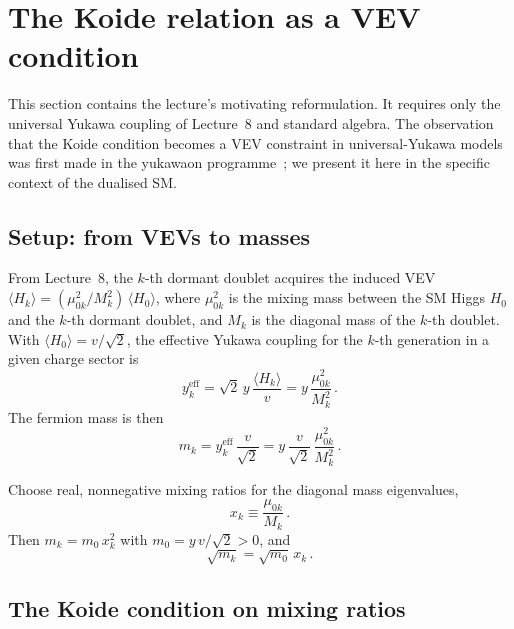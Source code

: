 \documentclass[11pt,a4paper]{article}
\begin{document}
\section{The Koide relation as a VEV condition}
\label{sec:koide-vev}

This section contains the lecture's motivating reformulation.  It requires only
the universal Yukawa coupling of Lecture~8 and standard algebra.
The observation that the Koide condition becomes a VEV constraint
in universal-Yukawa models was first made in the yukawaon
programme~\cite{Koide1983,HabaKoide2008,Ma2007}; we present it
here in the specific context of the dualised SM.

\subsection{Setup: from VEVs to masses}

From Lecture~8, the $k$-th dormant doublet acquires the induced VEV
$\langle H_k\rangle = (\mu_{0k}^2/M_k^2)\,\langle H_0\rangle$, where
$\mu_{0k}^2$ is the mixing mass between the SM Higgs $H_0$ and the
$k$-th dormant doublet, and $M_k$ is the diagonal mass of the $k$-th
doublet.  With $\langle H_0\rangle = v/\sqrt{2}$, the effective
Yukawa coupling for the $k$-th generation in a given charge sector
is
\begin{equation}
  y_k^{\text{eff}} = \sqrt{2}\,y\,\frac{\langle H_k\rangle}{v}
  = y\,\frac{\mu_{0k}^2}{M_k^2}\,.
  \label{eq:yk}
\end{equation}
The fermion mass is then
\begin{equation}
  m_k = y_k^{\text{eff}}\,\frac{v}{\sqrt{2}}
  = y\,\frac{v}{\sqrt{2}}\,\frac{\mu_{0k}^2}{M_k^2}\,.
  \label{eq:mk}
\end{equation}

Choose real, nonnegative mixing ratios for the diagonal mass eigenvalues,
\begin{equation}
  x_k \equiv \frac{\mu_{0k}}{M_k}\,.
  \label{eq:xk}
\end{equation}
Then $m_k = m_0\,x_k^2$ with $m_0 = y\,v/\sqrt{2}>0$, and
\begin{equation}
  \sqrt{m_k} = \sqrt{m_0}\,x_k\,.
  \label{eq:sqrtm}
\end{equation}

\subsection{The Koide condition on mixing ratios}
\end{document}
